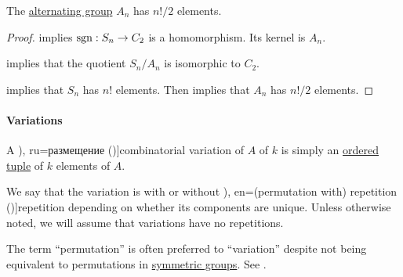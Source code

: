 \begin{proposition}\label{thm:alternating_group_cardinality}
  The \hyperref[def:alternating_group]{alternating group} \( A_n \) has \( n! / 2 \) elements.
\end{proposition}
\begin{proof}
   implies \( \operatorname{sgn}: S_n \to C_2 \) is a homomorphism. Its kernel is \( A_n \).

   implies that the quotient \( S_n / A_n \) is isomorphic to \( C_2 \).

   implies that \( S_n \) has \( n! \) elements. Then  implies that \( A_n \) has \( n! / 2 \) elements.
\end{proof}

\paragraph{Variations}

\begin{definition}\label{def:combinatorial_variation}\mimprovised
  A \term[bg=вариация (\cite[27]{ДимитровЯнев2007ВероятностиИСтатистика}), ru=размещение (\cite[171]{Яблонский2003ДискретнаяМатематика})]{combinatorial variation} of \( A \) of  \( k \) is simply an \hyperref[def:ordered_tuple]{ordered tuple} of \( k \) elements of \( A \).

  We say that the variation is with or without \term[bg=(вариация с) повторение (\cite[27]{ДимитровЯнев2007ВероятностиИСтатистика}), en=(permutation with) repetition (\cite[446]{Rosen2019DiscreteMathematics})]{repetition} depending on whether its components are unique. Unless otherwise noted, we will assume that variations have no repetitions.
\end{definition}
\begin{comments}
  \item The term \enquote{permutation} is often preferred to \enquote{variation} despite not being equivalent to permutations in \hyperref[def:symmetric_group]{symmetric groups}. See .
\end{comments}

